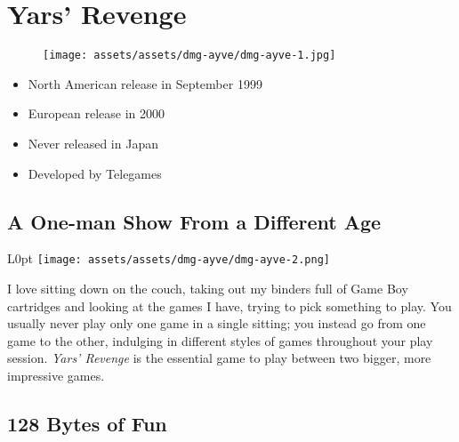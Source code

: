 \documentclass{book}
\begin{document}
\begingroup \chapter*{Yars’ Revenge} \endgroup
\begin{figure}[H]
\vskip 4pt
\centering
\texttt{[image: assets/assets/dmg-ayve/dmg-ayve-1.jpg]}\end{figure}
\begin{itemize} [nosep]




\item North American release in September 1999







\item European release in 2000








\item Never released in Japan





\item Developed by Telegames

\end{itemize}\noindent

\newpage\FloatBarrier\needspace{10mm}\section*{A One-man Show From a Different Age}\nopagebreak[4]
\begin{wrapfigure}{L}{0pt} \texttt{[image: assets/assets/dmg-ayve/dmg-ayve-2.png]}\end{wrapfigure}
I love sitting down on the couch, taking out my binders full of Game Boy cartridges and looking at the games I have, trying to pick something to play. You usually never play only one game in a single sitting; you instead go from one game to the other, indulging in different styles of games throughout your play session. \emph{Yars’ Revenge} is the essential game to play between two bigger, more impressive games.

\FloatBarrier\needspace{10mm}\section*{128 Bytes of Fun}\nopagebreak[4]
\end{document}
